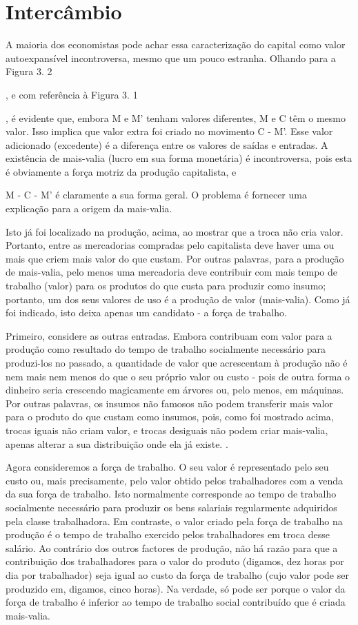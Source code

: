 \section{Intercâmbio}
 \par 
A maioria dos economistas pode achar essa caracterização do capital como valor autoexpansível incontroversa, mesmo que um pouco estranha. Olhando para a Figura {\color{blue}3}. {\color{blue} 2 } {\par} , e com referência à Figura {\color{blue}3}. {\color{blue} 1 } {\par} , é evidente que, embora M e M' tenham valores diferentes, M e C têm o mesmo valor. Isso implica que valor extra foi criado no movimento C - M'. Esse valor adicionado (excedente) é a diferença entre os valores de saídas e entradas. A existência de mais-valia (lucro em sua forma monetária) é incontroversa, pois esta é obviamente a força motriz da produção capitalista, e
 \par 
M - C - M' é claramente a sua forma geral. O problema é fornecer uma explicação para a origem da mais-valia.
 \par 
Isto já foi localizado na produção, acima, ao mostrar que a troca não cria valor. Portanto, entre as mercadorias compradas pelo capitalista deve haver uma ou mais que criem mais valor do que custam. Por outras palavras, para a produção de mais-valia, pelo menos uma mercadoria deve contribuir com mais tempo de trabalho (valor) para os produtos do que custa para produzir como insumo; portanto, um dos seus valores de uso é a produção de valor (mais-valia). Como já foi indicado, isto deixa apenas um candidato - a força de trabalho.
 \par 
Primeiro, considere as outras entradas. Embora contribuam com valor para a produção como resultado do tempo de trabalho socialmente necessário para produzi-los no passado, a quantidade de valor que acrescentam à produção não é nem mais nem menos do que o seu próprio valor ou custo - pois de outra forma o dinheiro seria crescendo magicamente em árvores ou, pelo menos, em máquinas. Por outras palavras, os insumos não famosos não podem transferir mais valor para o produto do que custam como insumos, pois, como foi mostrado acima, trocas iguais não criam valor, e trocas desiguais não podem criar mais-valia, apenas alterar a sua distribuição onde ela já existe. .
 \par 
Agora consideremos a força de trabalho. O seu valor é representado pelo seu custo ou, mais precisamente, pelo valor obtido pelos trabalhadores com a venda da sua força de trabalho. Isto normalmente corresponde ao tempo de trabalho socialmente necessário para produzir os bens salariais regularmente adquiridos pela classe trabalhadora. Em contraste, o valor criado pela força de trabalho na produção é o tempo de trabalho exercido pelos trabalhadores em troca desse salário. Ao contrário dos outros factores de produção, não há razão para que a contribuição dos trabalhadores para o valor do produto (digamos, dez horas por dia por trabalhador) seja igual ao custo da força de trabalho (cujo valor pode ser produzido em, digamos, cinco horas). Na verdade, só pode ser porque o valor da força de trabalho é inferior ao tempo de trabalho social contribuído que é criada mais-valia.
